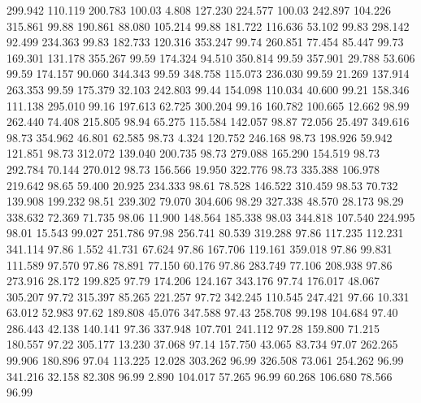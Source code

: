  299.942  110.119  200.783       100.03
   4.808  127.230  224.577       100.03
 242.897  104.226  315.861        99.88
 190.861   88.080  105.214        99.88
 181.722  116.636   53.102        99.83
 298.142   92.499  234.363        99.83
 182.733  120.316  353.247        99.74
 260.851   77.454   85.447        99.73
 169.301  131.178  355.267        99.59
 174.324   94.510  350.814        99.59
 357.901   29.788   53.606        99.59
 174.157   90.060  344.343        99.59
 348.758  115.073  236.030        99.59
  21.269  137.914  263.353        99.59
 175.379   32.103  242.803        99.44
 154.098  110.034   40.600        99.21
 158.346  111.138  295.010        99.16
 197.613   62.725  300.204        99.16
 160.782  100.665   12.662        98.99
 262.440   74.408  215.805        98.94
  65.275  115.584  142.057        98.87
  72.056   25.497  349.616        98.73
 354.962   46.801   62.585        98.73
   4.324  120.752  246.168        98.73
 198.926   59.942  121.851        98.73
 312.072  139.040  200.735        98.73
 279.088  165.290  154.519        98.73
 292.784   70.144  270.012        98.73
 156.566   19.950  322.776        98.73
 335.388  106.978  219.642        98.65
  59.400   20.925  234.333        98.61
  78.528  146.522  310.459        98.53
  70.732  139.908  199.232        98.51
 239.302   79.070  304.606        98.29
 327.338   48.570   28.173        98.29
 338.632   72.369   71.735        98.06
  11.900  148.564  185.338        98.03
 344.818  107.540  224.995        98.01
  15.543   99.027  251.786        97.98
 256.741   80.539  319.288        97.86
 117.235  112.231  341.114        97.86
   1.552   41.731   67.624        97.86
 167.706  119.161  359.018        97.86
  99.831  111.589   97.570        97.86
  78.891   77.150   60.176        97.86
 283.749   77.106  208.938        97.86
 273.916   28.172  199.825        97.79
 174.206  124.167  343.176        97.74
 176.017   48.067  305.207        97.72
 315.397   85.265  221.257        97.72
 342.245  110.545  247.421        97.66
  10.331   63.012   52.983        97.62
 189.808   45.076  347.588        97.43
 258.708   99.198  104.684        97.40
 286.443   42.138  140.141        97.36
 337.948  107.701  241.112        97.28
 159.800   71.215  180.557        97.22
 305.177   13.230   37.068        97.14
 157.750   43.065   83.734        97.07
 262.265   99.906  180.896        97.04
 113.225   12.028  303.262        96.99
 326.508   73.061  254.262        96.99
 341.216   32.158   82.308        96.99
   2.890  104.017   57.265        96.99
  60.268  106.680   78.566        96.99
